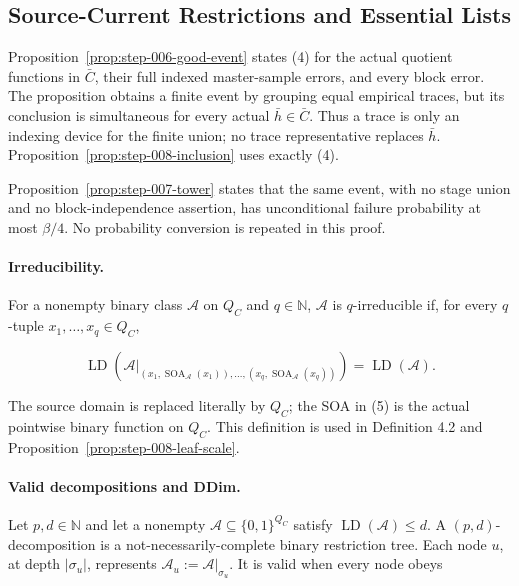 \subsection{Source-Current Restrictions and Essential Lists}\label{app:step_008}


Proposition~\ref{prop:step-006-good-event} states (4) for the
actual quotient functions in \(\bar C\), their full indexed master-sample
errors, and every block error. The proposition obtains a finite event by
grouping equal empirical traces, but its conclusion is simultaneous for
every actual \(\bar h\in\bar C\). Thus a trace is only an indexing device
for the finite union; no trace representative replaces \(\bar h\).
Proposition~\ref{prop:step-008-inclusion} uses exactly (4).

Proposition~\ref{prop:step-007-tower} states that the same event,
with no stage union and no block-independence assertion, has unconditional
failure probability at most \(\beta/4\). No probability conversion is
repeated in this proof.

\paragraph{Irreducibility.}

For a nonempty binary class \(\mathcal A\) on \(Q_C\) and
\(q\in\mathbb N\), \(\mathcal A\) is \(q\)-irreducible if, for every
\(q\)-tuple \(x_1,\ldots,x_q\in Q_C\),

\[
 \operatorname{LD}\!\left(
 \mathcal A|_{(x_1,\operatorname{SOA}_{\mathcal A}(x_1)),\ldots,
                    (x_q,\operatorname{SOA}_{\mathcal A}(x_q))}
 \right)
 =\operatorname{LD}(\mathcal A).
\tag{5}
\]

The source domain is replaced literally by \(Q_C\); the SOA in (5) is the
actual pointwise binary function on \(Q_C\). This definition is used in
Definition 4.2 and Proposition~\ref{prop:step-008-leaf-scale}.

\paragraph{Valid decompositions and DDim.}

Let \(p,d\in\mathbb N\) and let a nonempty
\(\mathcal A\subseteq\{0,1\}^{Q_C}\) satisfy
\(\operatorname{LD}(\mathcal A)\le d\). A \((p,d)\)-decomposition is a
not-necessarily-complete binary restriction tree. Each node \(u\), at
depth \(|\sigma_u|\), represents
\(\mathcal A_u:=\mathcal A|_{\sigma_u}\). It is valid when every node obeys

